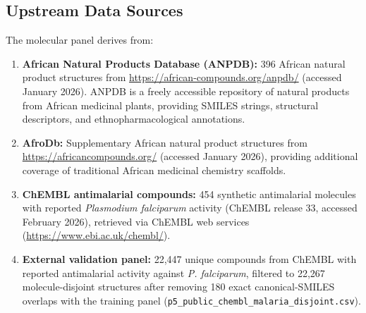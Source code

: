 \documentclass[11pt,a4paper]{article}
\begin{document}
%
%
%
%
%

\subsection*{Upstream Data Sources}

The molecular panel derives from:

\begin{enumerate}[leftmargin=*,itemsep=0.5em]
\item \textbf{African Natural Products Database (ANPDB):} 396 African natural product structures from \url{https://african-compounds.org/anpdb/} (accessed January 2026). ANPDB is a freely accessible repository of natural products from African medicinal plants, providing SMILES strings, structural descriptors, and ethnopharmacological annotations.

\item \textbf{AfroDb:} Supplementary African natural product structures from \url{https://africancompounds.org/} (accessed January 2026), providing additional coverage of traditional African medicinal chemistry scaffolds.

\item \textbf{ChEMBL antimalarial compounds:} 454 synthetic antimalarial molecules with reported \emph{Plasmodium falciparum} activity (ChEMBL release 33, accessed February 2026), retrieved via ChEMBL web services (\url{https://www.ebi.ac.uk/chembl/}).

\item \textbf{External validation panel:} 22,447 unique compounds from ChEMBL with reported antimalarial activity against \emph{P. falciparum}, filtered to 22,267 molecule-disjoint structures after removing 180 exact canonical-SMILES overlaps with the training panel (\texttt{p5\_public\_chembl\_malaria\_disjoint.csv}).
\end{enumerate}
\end{document}
